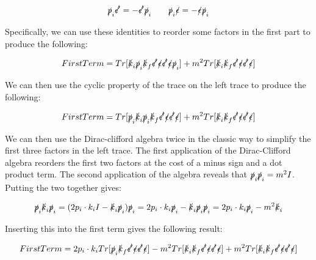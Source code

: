 \documentclass[a4]{article}
\begin{document}
    \begin{equation}
        \slashed{p}_i \slashed{\epsilon'} = - \slashed{\epsilon'} \slashed{p}_i \qquad \slashed{p}_i \slashed{\epsilon} = - \slashed{\epsilon} \slashed{p}_i
    \end{equation}

    Specifically, we can use these identities to reorder some factors in the first part to produce the following:

    \begin{equation}
        First Term = Tr [\slashed{k}_i \slashed{p}_i \slashed{k}_f \slashed{\epsilon'} \slashed{\epsilon} \slashed{\epsilon'} \slashed{\epsilon} \slashed{p}_i] + m^2 Tr[\slashed{k}_i \slashed{k}_f \slashed{\epsilon'} \slashed{\epsilon} \slashed{\epsilon'} \slashed{\epsilon}]
    \end{equation}

    We can then use the cyclic property of the trace on the left trace to produce the following:

    \begin{equation}
        First Term = Tr [\slashed{p}_i \slashed{k}_i \slashed{p}_i \slashed{k}_f \slashed{\epsilon'} \slashed{\epsilon} \slashed{\epsilon'} \slashed{\epsilon}] + m^2 Tr[\slashed{k}_i \slashed{k}_f \slashed{\epsilon'} \slashed{\epsilon} \slashed{\epsilon'} \slashed{\epsilon}]
    \end{equation}

    We can then use the Dirac-clifford algebra twice in the classic way to simplify the first three factors in the left trace.
    The first application of the Dirac-Clifford algebra reorders the first two factors at the cost of a minus sign and a dot
    product term. The second application of the algebra reveals that $\slashed{p}_i \slashed{p}_i = m^2 I$. Putting the two
    together gives:

    \begin{equation}
        \slashed{p}_i \slashed{k}_i \slashed{p}_i = (2 p_i \cdot k_i I - \slashed{k}_i \slashed{p}_i) \slashed{p}_i = 2 p_i \cdot k_i \slashed{p}_i - \slashed{k}_i \slashed{p}_i \slashed{p}_i = 2 p_i \cdot k_i \slashed{p}_i - m^2 \slashed{k}_i
    \end{equation}

    Inserting this into the first term gives the following result:

    \begin{equation}
        First Term = 2 p_i \cdot k_i Tr [ \slashed{p}_i \slashed{k}_f \slashed{\epsilon'} \slashed{\epsilon} \slashed{\epsilon'} \slashed{\epsilon} ] - m^2 Tr[\slashed{k}_i \slashed{k}_f \slashed{\epsilon'} \slashed{\epsilon} \slashed{\epsilon'} \slashed{\epsilon}] + m^2 Tr[\slashed{k}_i \slashed{k}_f \slashed{\epsilon'} \slashed{\epsilon} \slashed{\epsilon'} \slashed{\epsilon} ]
    \end{equation}
\end{document}

